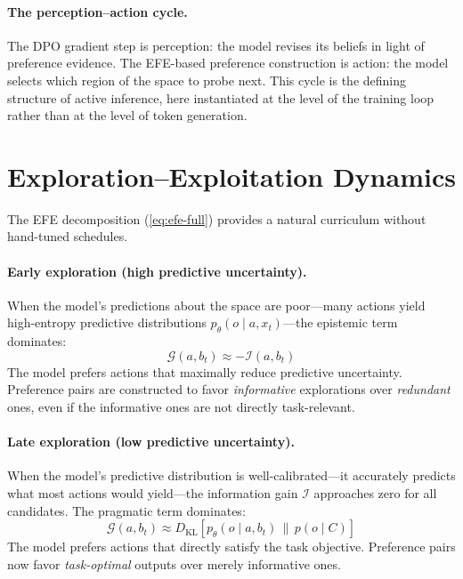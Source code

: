 \documentclass[11pt]{article}
\newcommand{\EFE}{\mathcal{G}}
\newcommand{\KL}[2]{D_{\mathrm{KL}}\!\left[#1 \,\|\, #2\right]}
\begin{document}
\paragraph{The perception--action cycle.}
The DPO gradient step is perception: the model revises its beliefs in light of preference evidence. The EFE-based preference construction is action: the model selects which region of the space to probe next. This cycle is the defining structure of active inference, here instantiated at the level of the training loop rather than at the level of token generation.


\section{Exploration--Exploitation Dynamics}
\label{sec:explore-exploit}

The EFE decomposition (\cref{eq:efe-full}) provides a natural curriculum without hand-tuned schedules.

\paragraph{Early exploration (high predictive uncertainty).}
When the model's predictions about the space are poor---many actions yield high-entropy predictive distributions $p_\theta(o \mid a, x_t)$---the epistemic term dominates:
\begin{equation}
\EFE(a, b_t) \approx -\mathcal{I}(a, b_t)
\end{equation}
The model prefers actions that maximally reduce predictive uncertainty. Preference pairs are constructed to favor \emph{informative} explorations over \emph{redundant} ones, even if the informative ones are not directly task-relevant.

\paragraph{Late exploration (low predictive uncertainty).}
When the model's predictive distribution is well-calibrated---it accurately predicts what most actions would yield---the information gain $\mathcal{I}$ approaches zero for all candidates. The pragmatic term dominates:
\begin{equation}
\EFE(a, b_t) \approx \KL{p_\theta(o \mid a, b_t)}{p(o \mid C)}
\end{equation}
The model prefers actions that directly satisfy the task objective. Preference pairs now favor \emph{task-optimal} outputs over merely informative ones.
\end{document}
